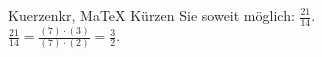 \begin{MAufgabe}{Kuerzen}{kr, MaTeX}
K\"urzen Sie soweit m\"oglich: $\frac{21}{14}$.\\ 
\ifLsg\MLoesung
\quad $\frac{21}{14}=\frac{(7)\cdot(3)}{(7)\cdot(2)}=\frac{3}{2}$.\else\relax\fi
 \end{MAufgabe}